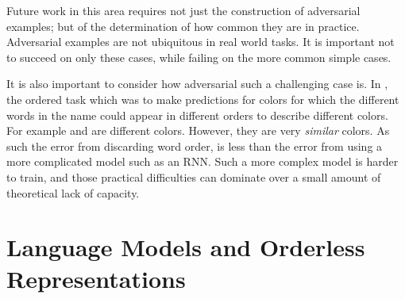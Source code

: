 \documentclass{book}
\begin{document}
Future work in this area requires not just the construction of adversarial examples; but of the determination of how common they are in practice.
Adversarial examples are not ubiquitous in real world tasks.
It is important not to succeed on only these cases, while failing on the more common simple cases.

It is also important to consider how adversarial such a challenging case is.
In , the ordered task which was to make predictions for colors for which the different words in the name could appear in different orders to describe different colors.
For example  and  are different colors.
However, they are very \emph{similar} colors.
As such the error from discarding word order, is less than the error from using a more complicated model such as an RNN.
Such a more complex model is harder to train, and those practical difficulties can dominate over a small amount of theoretical lack of capacity.



\section{Language Models and Orderless Representations}
\end{document}
